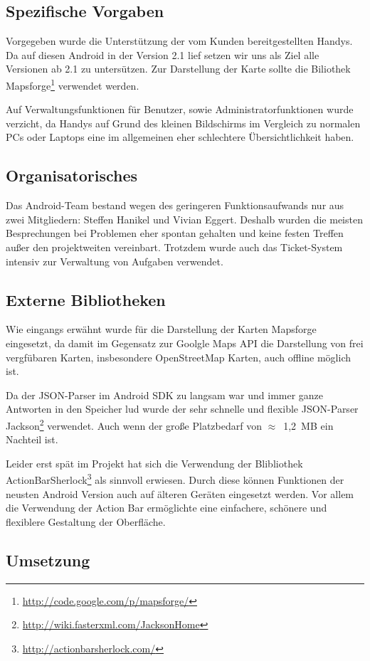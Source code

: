 \subsection*{Spezifische Vorgaben}
Vorgegeben wurde die Unterstützung der vom Kunden bereitgestellten Handys. Da auf diesen Android in der Version 2.1 lief setzen wir uns als Ziel alle Versionen ab 2.1 zu untersützen. Zur Darstellung der Karte sollte die Biliothek Mapsforge\footnote{\url{http://code.google.com/p/mapsforge/}} verwendet werden.

Auf Verwaltungsfunktionen für Benutzer, sowie Administratorfunktionen wurde verzicht, da Handys auf Grund des kleinen Bildschirms im Vergleich zu normalen PCs oder Laptops eine im allgemeinen eher schlechtere Übersichtlichkeit haben.

\subsection*{Organisatorisches}
Das Android-Team bestand wegen des geringeren Funktionsaufwands nur aus zwei Mitgliedern: Steffen Hanikel und Vivian Eggert. Deshalb wurden die meisten Besprechungen bei Problemen eher spontan gehalten und keine festen Treffen außer den projektweiten vereinbart. Trotzdem wurde auch das Ticket-System intensiv zur Verwaltung von Aufgaben verwendet.

\subsection*{Externe Bibliotheken}
Wie eingangs erwähnt wurde für die Darstellung der Karten Mapsforge eingesetzt, da damit im Gegensatz zur Goolgle Maps API die Darstellung von frei vergfübaren Karten, insbesondere OpenStreetMap Karten, auch offline möglich ist.

Da der JSON-Parser im Android SDK zu langsam war und immer ganze Antworten in den Speicher lud wurde der sehr schnelle und flexible JSON-Parser Jackson\footnote{\url{http://wiki.fasterxml.com/JacksonHome}} verwendet. Auch wenn der große Platzbedarf von $\approx$~1,2~MB ein Nachteil ist.

Leider erst spät im Projekt hat sich die Verwendung der Blibliothek ActionBarSherlock\footnote{\url{http://actionbarsherlock.com/}} als sinnvoll erwiesen. Durch diese können Funktionen der neusten Android Version auch auf älteren Geräten eingesetzt werden. Vor allem die Verwendung der Action Bar ermöglichte eine einfachere, schönere und flexiblere Gestaltung der Oberfläche.

\subsection*{Umsetzung}